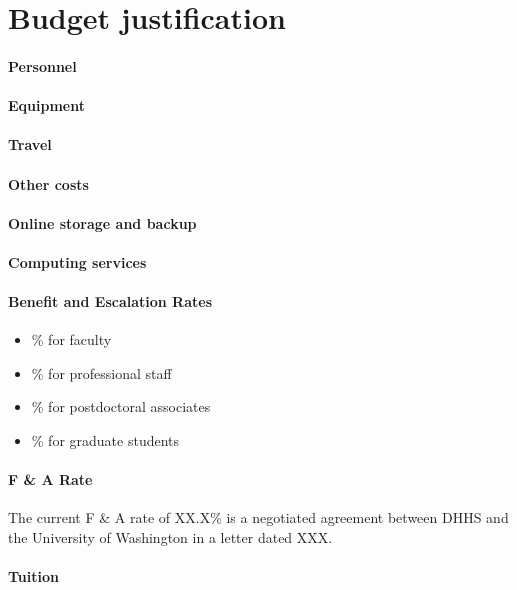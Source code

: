 \clearpage
\section*{Budget justification}

\paragraph{Personnel}

\paragraph{Equipment}

\paragraph{Travel}

\paragraph{Other costs}

\paragraph{Online storage and backup}

\paragraph{Computing services}

\paragraph{Benefit and Escalation Rates}
\begin{itemize}
\item \% for faculty
\item \% for professional staff
\item \% for postdoctoral associates
\item \% for graduate students
\end{itemize}

\paragraph{F \& A Rate}
The current F \& A rate of XX.X\% is a negotiated agreement between DHHS and the University of Washington in a letter dated XXX.

\paragraph{Tuition}
